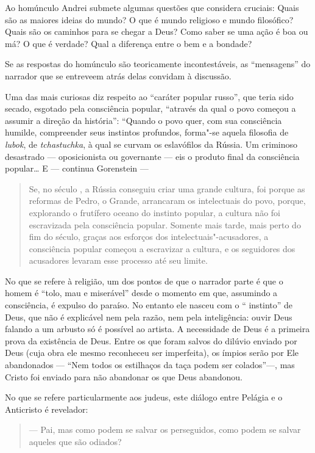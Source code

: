 {Ao homúnculo Andrei submete algumas questões que considera cruciais: Quais são
as maiores ideias do mundo? O que é mundo religioso e mundo filosófico?
Quais são os caminhos para se chegar a Deus? Como saber se uma ação é
boa ou má? O que é verdade? Qual a diferença entre o bem e a bondade?

Se as respostas do homúnculo são teoricamente incontestáveis, as
``mensagens'' do narrador que se entreveem atrás delas convidam à
discussão.

Uma das mais curiosas diz respeito ao ``caráter popular russo'', que
teria sido secado, esgotado pela consciência popular, ``através da qual
o povo começou a assumir a direção da história'': ``Quando o povo quer,
com sua consciência humilde, compreender seus instintos profundos,
forma"-se aquela filosofia de \emph{lubok}, de \emph{tchastuchka}, à qual
se curvam os eslavófilos da Rússia. Um criminoso desastrado ---
oposicionista ou governante --- eis o produto final da consciência
popular\ldots{} E --- continua Gorenstein ---

\begin{quote}
Se, no século , a Rússia conseguiu criar uma grande
cultura, foi porque as reformas de Pedro, o Grande, arrancaram os
intelectuais do povo, porque, explorando o frutífero oceano do instinto
popular, a cultura não foi escravizada pela consciência popular. Somente
mais tarde, mais perto do fim do século, graças aos esforços dos
intelectuais"-acusadores, a consciência popular começou a escravizar a
cultura, e os seguidores dos acusadores levaram esse processo até seu
limite.
\end{quote}

No que se refere à religião, um dos pontos de que o narrador parte é que
o homem é ``tolo, mau e miserável'' desde o momento em que, assumindo a
consciência, é expulso do paraíso. No entanto ele nasceu com o ``
instinto'' de Deus, que não é explicável nem pela razão, nem pela
inteligência: ouvir Deus falando a um arbusto só é possível ao artista.
A necessidade de Deus é a primeira prova da existência de Deus. Entre os
que foram salvos do dilúvio enviado por Deus (cuja obra ele mesmo
reconheceu ser imperfeita), os ímpios serão por Ele abandonados ---
``Nem todos os estilhaços da taça podem ser colados''---, mas Cristo
foi enviado para não abandonar os que Deus abandonou.

No que se refere particularmente aos judeus, este diálogo entre Pelágia
e o Anticristo é revelador:

\begin{quote}
--- Pai, mas como podem se salvar os perseguidos, como podem se salvar
aqueles que são odiados?


\end{quote}}
